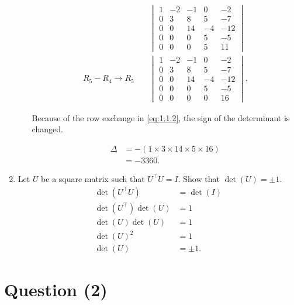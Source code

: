 \documentclass{zc-ust-hw}
\begin{document}
\begin{enumerate}[label=1.\arabic*]
\begin{enumerate}[label=\roman*.]
\begin{align}
          &\quad
          \begin{vmatrix}
            1 & -2 & -1 & 0  & -2  \\
            0 & 3  & 8  & 5  & -7  \\
            0 & 0  & 14 & -4 & -12 \\
            0 & 0  & 0  & 5  & -5  \\
            0 & 0  & 0  & 5  & 11
          \end{vmatrix}
          \\
          R_5 - R_4 \rightarrow R_5
          &\quad
          \begin{vmatrix}
            1 & -2 & -1 & 0  & -2  \\
            0 & 3  & 8  & 5  & -7  \\
            0 & 0  & 14 & -4 & -12 \\
            0 & 0  & 0  & 5  & -5  \\
            0 & 0  & 0  & 0  & 16
          \end{vmatrix}
        .\end{align}
        \begin{center}
          Because of the row exchange in \eqref{eq:1.1.2}, the sign of the determinant is changed.
        \end{center}
        \begin{align}
          \Delta &= -( 1 \times 3 \times 14 \times 5 \times 16 ) \\
                 &= -3360
        .\end{align}
    \end{enumerate}
  \item Let $U$ be a square matrix such that $U^\intercal U=I$. Show that $\det(U)=\pm1$. 
      \begin{align}
        \det(U^\intercal U) &= \det(I) \\
        \det(U^\intercal) \det(U) &= 1 \\
        \det(U) \det(U) &= 1 \\
        \det(U)^2 &= 1 \\
        \det(U) &= \pm 1
      .\end{align}
\end{enumerate}

\newpage

\section*{Question (2)}
\end{document}
